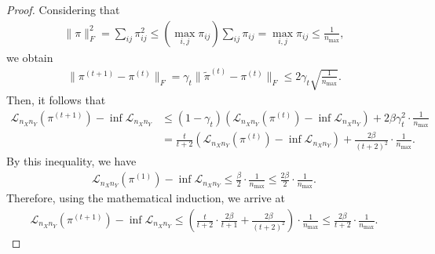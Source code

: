 \documentclass{article}
\begin{document}
\begin{proof}
	Considering that
	\begin{align*}
		\|\pi\|_F^2 = \sum_{ij} \pi_{ij}^2 \leq (\max_{i,j}\pi_{ij}) \sum_{ij} \pi_{ij} = \max_{i,j} \pi_{ij} \leq \frac{1}{n_{\max}} ,
	\end{align*}
	we obtain
	\begin{align*}
		\|\pi^{(t+1)} - \pi^{(t)} \|_F = \gamma_t \|\tilde{\pi}^{(t)} - \pi^{(t)} \|_F \leq 2\gamma_t \sqrt{\frac{1}{n_{\max}}} .
	\end{align*}
	Then, it follows that
	\begin{align*}
		\mathcal{L}_{n_Xn_Y}(\pi^{(t+1)}) - \inf\mathcal{L}_{n_Xn_Y} &\leq (1 - \gamma_t)\left(\mathcal{L}_{n_Xn_Y}(\pi^{(t)}) - \inf\mathcal{L}_{n_Xn_Y}\right) + 2\beta\gamma_t^2\cdot\frac{1}{n_{\max}} \\
		&= \frac{t}{t+2}\left(\mathcal{L}_{n_Xn_Y}(\pi^{(t)}) - \inf\mathcal{L}_{n_Xn_Y}\right) + \frac{2\beta}{(t+2)^2}\cdot\frac{1}{n_{\max}} .
	\end{align*}
	By this inequality, we have
	\begin{align*}
		\mathcal{L}_{n_Xn_Y}(\pi^{(1)}) - \inf\mathcal{L}_{n_Xn_Y} \leq \frac{\beta}{2}\cdot\frac{1}{n_{\max}} \leq \frac{2\beta}{2}\cdot\frac{1}{n_{\max}} .
	\end{align*}
	Therefore, using the mathematical induction, we arrive at
	\begin{align*}
		\mathcal{L}_{n_Xn_Y}(\pi^{(t+1)}) - \inf\mathcal{L}_{n_Xn_Y} \leq \left(\frac{t}{t+2} \cdot \frac{2\beta}{t+1} + \frac{2\beta}{(t+2)^2}\right)\cdot\frac{1}{n_{\max}} \leq \frac{2\beta}{t+2}\cdot\frac{1}{n_{\max}} .
	\end{align*}
\end{proof}
\end{document}
